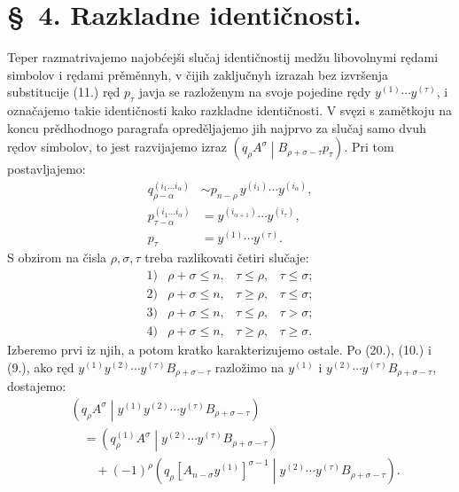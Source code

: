 \documentclass[11pt]{article}
\newcommand{\pair}[2]{\left(#1\middle|#2\right)}
\begin{document}
\section*{\S\ 4. Razkladne identičnosti.}

Teper razmatrivajemo najobćejši slučaj identičnostij medžu libovolnymi rędami simbolov i rędami prěměnnyh, v čijih zaključnyh izrazah bez izvršenja substitucije (11.) ręd $p_\tau$ javja se razloženym na svoje pojedine rędy $y^{(1)}\cdots y^{(\tau)}$, i označajemo takie identičnosti kako razkladne identičnosti. V svęzi s zamětkoju na koncu prědhodnogo paragrafa opreděljajemo jih najprvo za slučaj samo dvuh rędov simbolov, to jest razvijajemo izraz $\pair{q_\rho A^\sigma}{B_{\rho+\sigma-\tau}p_\tau}$. Pri tom postavljajemo:
\begin{equation}
\begin{aligned}
q_{\rho-\alpha}^{(i_1\ldots i_\alpha)}
&\sim p_{n-\rho}\,y^{(i_1)}\cdots y^{(i_\alpha)},\\
p_{\tau-\alpha}^{(i_1\ldots i_\alpha)}
&=y^{(i_{\alpha+1})}\cdots y^{(i_\tau)},\\
p_\tau&=y^{(1)}\cdots y^{(\tau)}.
\end{aligned}
\tag{22}
\end{equation}
S obzirom na čisla $\rho,\sigma,\tau$ treba razlikovati četiri slučaje:
\[
\begin{array}{llll}
1)&\rho+\sigma\le n,& \tau\le\rho,& \tau\le\sigma;\\[2pt]
2)&\rho+\sigma\le n,& \tau\ge\rho,& \tau\le\sigma;\\[2pt]
3)&\rho+\sigma\le n,& \tau\le\rho,& \tau>\sigma;\\[2pt]
4)&\rho+\sigma\le n,& \tau\ge\rho,& \tau\ge\sigma.
\end{array}
\]
Izberemo prvi iz njih, a potom kratko karakterizujemo ostale. Po (20.), (10.) i (9.), ako ręd $y^{(1)}y^{(2)}\cdots y^{(\tau)}B_{\rho+\sigma-\tau}$ razložimo na $y^{(1)}$ i $y^{(2)}\cdots y^{(\tau)}B_{\rho+\sigma-\tau}$, dostajemo:
\begin{equation}
\begin{aligned}
&\pair{q_\rho A^\sigma}{y^{(1)}y^{(2)}\cdots y^{(\tau)}
B_{\rho+\sigma-\tau}}\\
&\quad=\pair{q_\rho^{(1)}A^\sigma}
{y^{(2)}\cdots y^{(\tau)}B_{\rho+\sigma-\tau}}\\
&\qquad+(-1)^\rho
\pair{q_\rho[A_{n-\sigma}y^{(1)}]^{\sigma-1}}
{y^{(2)}\cdots y^{(\tau)}B_{\rho+\sigma-\tau}}.
\end{aligned}
\tag{23}
\end{equation}
\end{document}
